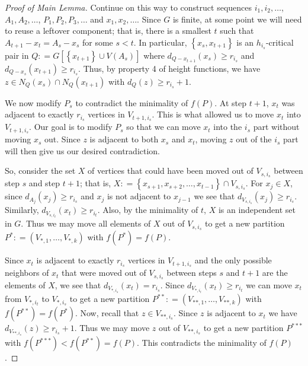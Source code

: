 \documentclass[12pt]{amsart}
\theoremstyle{plain}
\theoremstyle{definition}
\theoremstyle{remark}
\newcommand{\set}[1]{\left\{ #1 \right\}}
\newcommand{\parens}[1]{\left( #1 \right)}
\newcommand{\DefinedAs}{\mathrel{\mathop:}=}
\begin{document}
\begin{proof}[Proof of Main Lemma]
Continue on this way to construct sequences $i_1, i_2, \ldots$, $A_1, A_2, \ldots$, $P_1, P_2, P_3, \ldots$ and $x_1, x_2, \ldots$.  Since $G$ is finite, at some point we will need to reuse a leftover component; that is, there is a smallest $t$ such that $A_{t + 1} - x_t = A_s - x_s$ for some $s < t$.  In particular, $\set{x_s, x_{t+1}}$ is an $h_{i_s}$-critical pair in  $Q \DefinedAs G\left[\set{x_{t+1}} \cup V(A_s)\right]$ where $d_{Q-x_{t+1}}(x_s) \geq r_{i_s}$ and $d_{Q-x_s}(x_{t+1}) \geq r_{i_s}$.  Thus, by property 4 of height functions, we have $z \in N_Q(x_s) \cap N_Q(x_{t+1})$ with $d_Q(z) \geq r_{i_s} + 1$.

We now modify $P_s$ to contradict the minimality of $f(P)$.  At step $t+1$,  $x_t$ was adjacent to exactly $r_{i_s}$ vertices in $V_{t+1, i_s}$. This is what allowed us to move $x_t$ into $V_{t+1, i_s}$.  Our goal is to modify $P_s$ so that we can move $x_t$ into the $i_s$ part without moving $x_s$ out. Since $z$ is adjacent to both $x_s$ and $x_t$, moving $z$ out of the $i_s$ part will then give us our desired contradiction.  

So, consider the set $X$ of vertices that could have been moved out of $V_{s, i_s}$ between step $s$ and step $t+1$; that is, $X \DefinedAs \set{x_{s+1}, x_{s+2}, \ldots, x_{t-1}} \cap V_{s, i_s}$.  For $x_j \in X$, since $d_{A_j}(x_j) \geq r_{i_s}$ and $x_j$ is not adjacent to $x_{j-1}$ we see that $d_{V_{s, i_s}}(x_j) \geq r_{i_s}$.  Similarly, $d_{V_{s, i_t}}(x_t) \geq r_{i_t}$. Also, by the minimality of $t$, $X$ is an independent set in $G$.  Thus we may move all elements of $X$ out of $V_{s, i_s}$ to get a new partition $P^* \DefinedAs \parens{V_{*, 1}, \ldots, V_{*, k}}$ with $f(P^*) = f(P)$. 

Since $x_t$ is adjacent to exactly $r_{i_s}$ vertices in $V_{t+1, i_s}$ and the only possible neighbors of $x_t$ that were moved out of $V_{s, i_s}$ between steps $s$ and $t+1$ are the elements of $X$, we see that $d_{V_{*, i_s}}(x_t) = r_{i_s}$.  Since $d_{V_{*, i_t}}(x_t) \geq r_{i_t}$ we can move $x_t$ from $V_{*, i_t}$ to $V_{*, i_s}$ to get a new partition $P^{**} \DefinedAs \parens{V_{**, 1}, \ldots, V_{**, k}}$ with $f(P^{**}) = f(P^*)$.  Now, recall that $z \in V_{**, i_s}$.  Since $z$ is adjacent to $x_t$ we have $d_{V_{**, i_s}}(z) \geq r_{i_s} + 1$.  Thus we may move $z$ out of $V_{**, i_s}$ to get a new partition $P^{***}$ with $f(P^{***}) < f(P^{**}) = f(P)$.  This contradicts the minimality of $f(P)$.
\end{proof}
\end{document}
